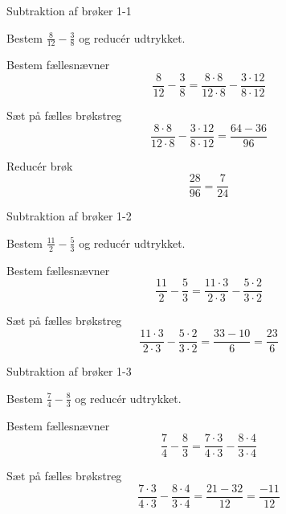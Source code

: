 \documentclass{article}
\begin{document}
\tableofcontents
\newpage

\begin{exercise}{Subtraktion af brøker 1-1}

Bestem $\frac{8}{12} - \frac{3}{8}$ og reducér udtrykket.


\hint

Bestem fællesnævner
\[
\frac{8}{12} - \frac{3}{8} = \frac{8 \cdot 8}{12 \cdot 8} - \frac{3 \cdot 12}{8\cdot 12}
\]

\hint

Sæt på fælles brøkstreg
\[
\frac{8 \cdot 8}{12 \cdot 8} - \frac{3 \cdot 12}{8\cdot 12} = \frac{64 - 36}{96}
\]

\hint

Reducér brøk
\[
\frac{28}{96} = \frac{7}{24}
\]

\end{exercise}

\newpage

\begin{exercise}{Subtraktion af brøker 1-2}

Bestem $\frac{11}{2} - \frac{5}{3}$ og reducér udtrykket.


\hint

Bestem fællesnævner
\[
\frac{11}{2} - \frac{5}{3} = \frac{11 \cdot 3}{2 \cdot 3} - \frac{5 \cdot 2}{3\cdot 2}
\]

\hint

Sæt på fælles brøkstreg
\[
\frac{11 \cdot 3}{2 \cdot 3} - \frac{5 \cdot 2}{3\cdot 2} = \frac{33 - 10}{6} = \frac{23}{6}
\]

\end{exercise}
\newpage

\begin{exercise}{Subtraktion af brøker 1-3}

Bestem $\frac{7}{4} - \frac{8}{3}$ og reducér udtrykket.


\hint

Bestem fællesnævner
\[
\frac{7}{4} - \frac{8}{3} = \frac{7 \cdot 3}{4 \cdot 3} - \frac{8 \cdot 4}{3\cdot 4}
\]

\hint

Sæt på fælles brøkstreg
\[
\frac{7 \cdot 3}{4 \cdot 3} - \frac{8 \cdot 4}{3\cdot 4} = \frac{21 - 32}{12} = \frac{-11}{12}
\]

\end{exercise}
\end{document}
